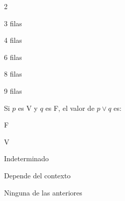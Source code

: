 \begin{multicols}{2}
		\begin{alternativas}
			\item 3 filas
			\item 4 filas
			\item 6 filas
			\item 8 filas
			\item 9 filas
		\end{alternativas}
		\vspace{0.3cm}
		
		\ejercicio Si $p$ es V y $q$ es F, el valor de $p \vee q$ es:
		
		\begin{alternativas}
			\item F
			\item V
			\item Indeterminado
			\item Depende del contexto
			\item Ninguna de las anteriores
		\end{alternativas}
		
	\end{multicols}
	
	\vspace{0.3cm}
	
	\begin{tcolorbox}[
		enhanced, colback=AzulClaro!40, colframe=AzulMedio,
		arc=2pt, boxrule=0.5pt, fonttitle=\sffamily\bfseries\small,
		title={Nivel Intermedio}, left=4pt, right=4pt, top=3pt, bottom=3pt
		]
	\end{tcolorbox}
	
